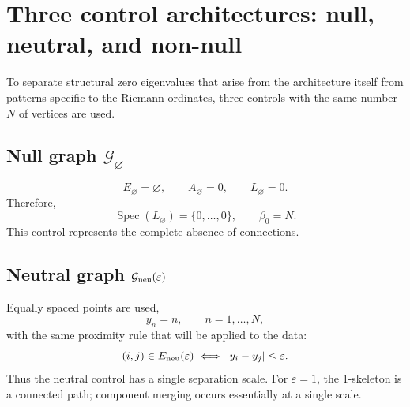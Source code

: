 \documentclass[11pt]{amsart}
\theoremstyle{definition}
\theoremstyle{remark}
\begin{document}
\section{Three control architectures: null, neutral, and non-null}
To separate structural zero eigenvalues that arise from the architecture itself from patterns specific to the Riemann ordinates, three controls with the same number $N$ of vertices are used.

\subsection{Null graph $\mathcal G_{\varnothing}$}
\begin{equation}
 E_{\varnothing}=\varnothing,\qquad A_{\varnothing}=0,\qquad L_{\varnothing}=0.
\end{equation}
Therefore,
\begin{equation}
 \operatorname{Spec}(L_{\varnothing})=\{0,\ldots,0\},\qquad \beta_0=N.
\end{equation}
This control represents the complete absence of connections.

\subsection{Neutral graph $\mathcal G_{\rm neu}(\varepsilon)$}
Equally spaced points are used,
\begin{equation}
 y_n=n,\qquad n=1,\ldots,N,
\end{equation}
with the same proximity rule that will be applied to the data:
\begin{equation}\label{eq:neutraledge}
 (i,j)\in E_{\rm neu}(\varepsilon)
 \iff |y_i-y_j|\le\varepsilon.
\end{equation}
Thus the neutral control has a single separation scale. For $\varepsilon=1$, the 1-skeleton is a connected path; component merging occurs essentially at a single scale.
\end{document}
